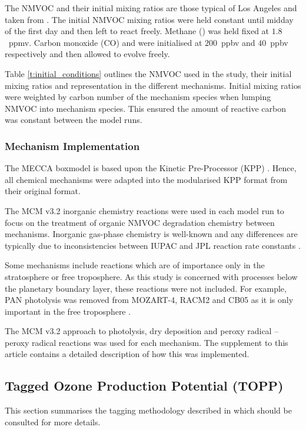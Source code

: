 The NMVOC and their initial mixing ratios are those typical of Los Angeles and taken from \citet{Baker:2008}. 
The initial NMVOC mixing ratios were held constant until midday of the first day and then left to react freely. 
Methane () was held fixed at \mbox{$1.8$ ppmv}. 
Carbon monoxide (CO) and  were initialised at \mbox{$200$ ppbv} and \mbox{$40$ ppbv} respectively and then allowed to evolve freely.

Table \ref{t:initial_conditions} outlines the NMVOC used in the study, their initial mixing ratios and representation in the different mechanisms.
Initial mixing ratios were weighted by carbon number of the mechanism species when lumping NMVOC into mechanism species. 
This ensured the amount of reactive carbon was constant between the model runs.

\subsubsection{Mechanism Implementation} %

The MECCA boxmodel \citep{Sander:2011} is based upon the Kinetic Pre-Processor (KPP) \citep{Damian:2002}. 
Hence, all chemical mechanisms were adapted into the modularised KPP format from their original format.

The MCM v3.2 inorganic chemistry reactions were used in each model run to focus on the treatment of organic NMVOC degradation chemistry between mechanisms. 
Inorganic gas-phase chemistry is well-known and any differences are typically due to inconsistencies between IUPAC and JPL reaction rate constants \citep{Emmerson:2009}.

Some mechanisms include reactions which are of importance only in the stratosphere or free troposphere. 
As this study is concerned with processes below the planetary boundary layer, these reactions were not included. 
For example, PAN photolysis was removed from MOZART-4, RACM2 and CB05 as it is only important in the free troposphere \citep{Harwood:2003}.  

The MCM v3.2 approach to photolysis, dry deposition and peroxy radical -- peroxy radical reactions was used for each mechanism. 
The supplement to this article contains a detailed description of how this was implemented.

\subsection{Tagged Ozone Production Potential (TOPP)}
This section summarises the tagging methodology described in \citet{Butler:2011} which should be consulted for more details.

